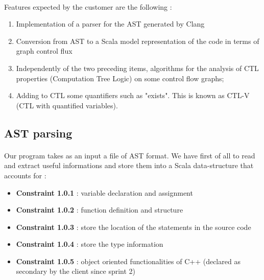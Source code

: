 \documentclass{report}
\begin{document}
\paragraph{}
\hspace{4mm}Features expected by the customer are the following :

\begin{enumerate}
        \item Implementation of a parser for the AST generated by Clang
        \item Conversion from AST to a Scala model representation of the code in terms of graph control flux
        \item Independently of the two preceding items, algorithms for the analysis of CTL properties (Computation Tree Logic) on some control flow graphs;
        \item Adding to CTL some quantifiers such as "exists". This is known as CTL-V (CTL with quantified variables).
    \end{enumerate}
\subsection{AST parsing}

\paragraph{}
\hspace{4mm}Our program takes as an input a file of AST format. We have first of all to read and extract useful informations and store them into a Scala data-structure that 
accounts for :

\vspace{1.5mm}
\begin{itemize}
\item \textbf{Constraint 1.0.1} : variable declaration and assignment\vspace{1mm}
\item \textbf{Constraint 1.0.2} : function definition and structure\vspace{1mm}
\item \textbf{Constraint 1.0.3} : store the location of the statements in the source code\vspace{1mm}
\item \textbf{Constraint 1.0.4} : store the type information\vspace{1mm}
\item \textbf{Constraint 1.0.5} : object oriented functionalities of C++ (declared as secondary by the client since sprint 2)\vspace{1mm}
\end{itemize}
\end{document}
